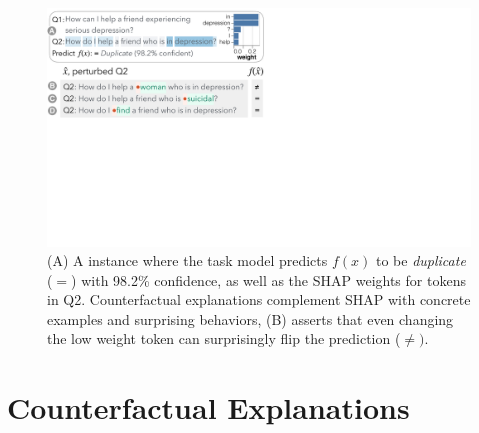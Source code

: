 
\newcommand{\fwone}[1]{\colbox{cfwone}{#1}\xspace}
\newcommand{\fwtwo}[1]{\colbox{cfwtwo}{#1}\xspace}
\newcommand{\fwthree}[1]{\colbox{cfwthree}{#1}\xspace}
\newcommand{\fwfour}[1]{\colbox{cfwfour}{#1}\xspace}

\newcommand{\fexp}[2]{\texttt{[{\color{darkgray}{#1:#2}}]}\xspace}
\newcommand{\fexptag}[1]{\fexp{TAG}{#1}}
\newcommand{\fexpfrom}[1]{\fexp{FROM}{#1}}
\newcommand{\fexpto}[1]{\fexp{TO}{#1}}
\newcommand{\fexptemp}[1]{\fexp{TEMP}{#1}}


\begin{figure}[t]
\centering
\includegraphics[trim={0 21cm 33cm 0cm},clip,width=1\columnwidth]{figures/explanation_v2.pdf}
\vspace{-15pt}
\caption{
(A) A \qqp instance where the task model\footnotemark{} predicts $f(x)$ to be \emph{duplicate} ($=$) with 98.2\% confidence, as well as the SHAP weights for tokens in Q2.
Counterfactual explanations complement SHAP with concrete examples and surprising behaviors, \eg (B) asserts that even changing the low weight token  can surprisingly flip the prediction ($\neq)$.
}
\vspace{-10pt}
\label{fig:explanation}
\end{figure}
\section{Counterfactual Explanations}
\label{sec:app_explain}

